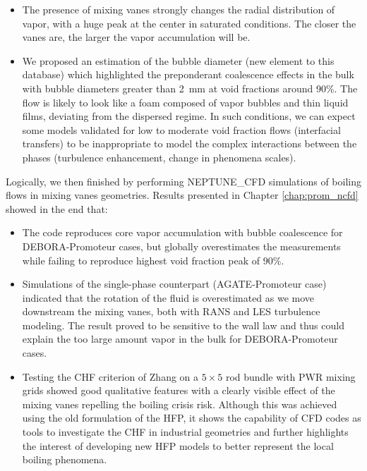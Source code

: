 \begin{itemize}
\item The presence of mixing vanes strongly changes the radial distribution of vapor, with a huge peak at the center in saturated conditions. The closer the vanes are, the larger the vapor accumulation will be.
\item We proposed an estimation of the bubble diameter (new element to this database) which highlighted the preponderant coalescence effects in the bulk with bubble diameters greater than 2\ mm at void fractions around 90\%. The flow is likely to look like a foam composed of vapor bubbles and thin liquid films, deviating from the dispersed regime. In such conditions, we can expect some models validated for low to moderate void fraction flows (\eg interfacial transfers) to be inappropriate to model the complex interactions between the phases (\eg turbulence enhancement, change in phenomena scales).
\end{itemize}

Logically, we then finished by performing NEPTUNE\_CFD simulations of boiling flows in mixing vanes geometries. Results presented in Chapter \ref{chap:prom_ncfd} showed in the end that:

\begin{itemize}
\item The code reproduces core vapor accumulation with bubble coalescence for DEBORA-Promoteur cases, but globally overestimates the measurements while failing to reproduce highest void fraction peak of $90\%$.
\item Simulations of the single-phase counterpart (AGATE-Promoteur case) indicated that the rotation of the fluid is overestimated as we move downstream the mixing vanes, both with RANS and LES turbulence modeling. The result proved to be sensitive to the wall law and thus could explain the too large amount vapor in the bulk for DEBORA-Promoteur cases.
\item Testing the CHF criterion of Zhang \cite{zhang_new_2022} on a $5 \times 5$ rod bundle with PWR mixing grids showed good qualitative features with a clearly visible effect of the mixing vanes repelling the boiling crisis risk. Although this was achieved using the old formulation of the HFP, it shows the capability of CFD codes as tools to investigate the CHF in industrial geometries and further highlights the interest of developing new HFP models to better represent the local boiling phenomena.
\end{itemize}

